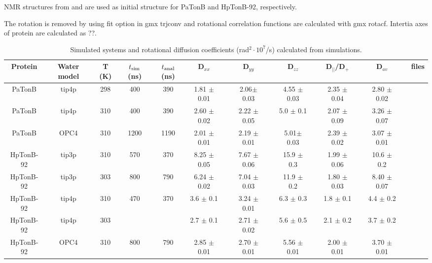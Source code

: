 \documentclass[pre,aps,floatfix,authordate1-4,twocolumn]{revtex4-1}
\begin{document}
NMR structures from \cite{??} and \cite{??} are used as initial structure for 
PaTonB and HpTonB-92, respectively.

The rotation is removed by using fit option in gmx trjconv and rotational
correlation functions are calculated with gmx rotacf. Intertia axes of protein
are calculated as ??.

\begin{table}[htb]
\centering
\caption{Simulated systems and rotational diffusion coefficients (rad$^2\cdot 10^7$/s) calculated from simulations.
}\label{ROTdiffCOEFFS}
\begin{tabular}{c c c c c c c c c c c c c c c c}
Protein     & Water model & T (K)  &  $t_{\rm sim}$ (ns)   &  $t_{\rm anal}$ (ns)   & D$_{xx}$ &&D$_{yy}$ &&D$_{zz}$ &&D$_{||}$/D$_+$ & &D$_{av}$& &files \\
\hline
PaTonB      & tip4p       & 298    & 400                 &  390                 & 1.81 $\pm$ 0.01 && 2.06$\pm$ 0.03 && 4.55 $\pm$ 0.03 && 2.35 $\pm$ 0.04 && 2.80 $\pm$ 0.02 && \cite{??} \\
PaTonB      & tip4p       & 310    & 400                 &  390                 &  2.60 $\pm$ 0.02 &&  2.22 $\pm$ 0.05& &  5.0  $\pm$ 0.1  & &  2.07 $\pm$ 0.09& &   3.26 $\pm$  0.07 && \cite{??}\\
PaTonB      & OPC4        & 310    & 1200                &  1190                &  2.01 $\pm$ 0.01 && 2.19 $\pm$ 0.01 && 5.01$\pm$ 0.03 && 2.39 $\pm$ 0.02 && 3.07 $\pm$ 0.01 && \cite{??}  \\
HpTonB-92   & tip3p       & 310    & 570           	 &  370                 & 8.25 $\pm$ 0.05 && 7.67 $\pm$ 0.06 && 15.9 $\pm$ 0.3 && 1.99 $\pm$ 0.06 &&  10.6 $\pm$ 0.2 &&  \cite{??} \\
HpTonB-92   & tip3p       & 303    & 800           	 &  790                 & 6.24 $\pm$ 0.02 && 7.04 $\pm$ 0.03 && 11.9 $\pm$ 0.2 && 1.80 $\pm$ 0.03 && 8.40 $\pm$ 0.07 && \cite{??} \\
HpTonB-92   & tip4p       & 310    & 470           	 &  370                 & 3.6 $\pm$ 0.1 && 3.24 $\pm$ 0.01 && 6.3 $\pm$ 0.3 && 1.8 $\pm$ 0.1 && 4.4 $\pm$ 0.2 && \cite{??} \\
HpTonB-92   & tip4p       & 303    &            	 &                      & 2.7 $\pm$ 0.1 && 2.71 $\pm$ 0.02 && 5.6 $\pm$ 0.5 && 2.1 $\pm$ 0.2 && 3.7 $\pm$ 0.2 && \cite{??} \\
HpTonB-92   & OPC4        & 310    & 800           	 &  790                 & 2.85 $\pm$ 0.01 && 2.70 $\pm$ 0.01 && 5.56 $\pm$ 0.01 && 2.00 $\pm$ 0.01 && 3.70 $\pm$ 0.01 && \cite{??} \\
\end{tabular}
\end{table}
\end{document}
